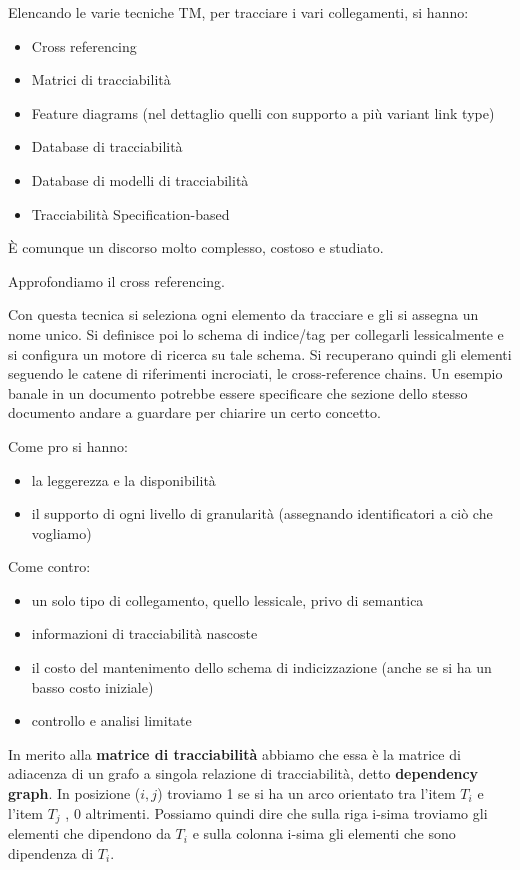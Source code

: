 Elencando le varie tecniche TM, per tracciare i vari collegamenti, si hanno:
\begin{itemize}
    \item Cross referencing
    \item Matrici di tracciabilità
    \item Feature diagrams (nel dettaglio quelli con supporto a più variant link
          type)
    \item Database di tracciabilità
    \item Database di modelli di tracciabilità
    \item Tracciabilità Specification-based
\end{itemize}
È comunque un discorso molto complesso, costoso e studiato.

Approfondiamo il cross referencing.

Con questa tecnica si seleziona ogni elemento da tracciare e gli si assegna un
nome unico. Si definisce poi lo schema di indice/tag per collegarli lessicalmente e
si configura un motore di ricerca su tale schema. Si recuperano quindi gli elementi
seguendo le catene di riferimenti incrociati, le cross-reference chains. Un esempio
banale in un documento potrebbe essere specificare che sezione dello stesso documento
andare a guardare per chiarire un certo concetto.

Come pro si hanno:
\begin{itemize}
    \item la leggerezza e la disponibilità
    \item il supporto di ogni livello di granularità (assegnando identificatori
          a ciò che vogliamo)
\end{itemize}
Come contro:
\begin{itemize}
    \item un solo tipo di collegamento, quello lessicale, privo di semantica
    \item informazioni di tracciabilità nascoste
    \item il costo del mantenimento dello schema di indicizzazione (anche se si ha
          un basso costo iniziale)
    \item controllo e analisi limitate
\end{itemize}
In merito alla \textbf{matrice di tracciabilità} abbiamo che essa è la matrice
di adiacenza di un grafo a singola relazione di tracciabilità, detto \textbf{dependency graph}.
In posizione ($i,j$) troviamo 1 se si ha un arco orientato tra l'item $T_i$ e
l'item $T_j$ , 0 altrimenti. Possiamo quindi dire che sulla riga i-sima troviamo
gli elementi che dipendono da $T_i$ e sulla colonna i-sima gli elementi che sono
dipendenza di $T_i$.

